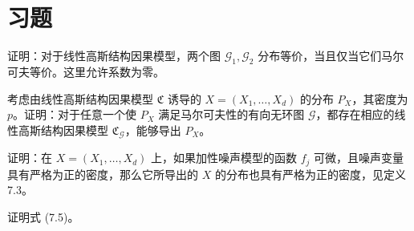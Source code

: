 \FloatBarrier
\section{习题}
\setcounter{problem}{11}
\begin{problem}[高斯结构因果模型]
证明：对于线性高斯结构因果模型，两个图 $\mathcal G_1,\mathcal G_2$ 分布等价，当且仅当它们马尔可夫等价。这里允许系数为零。
\end{problem}

\begin{problem}[高斯结构因果模型]
考虑由线性高斯结构因果模型 $\mathfrak C$ 诱导的 $X=(X_1,\ldots,X_d)$ 的分布 $P_X$，其密度为 $p$。证明：对于任意一个使 $P_X$ 满足马尔可夫性的有向无环图 $\mathcal G$，都存在相应的线性高斯结构因果模型 $\mathfrak C_{\mathcal G}$，能够导出 $P_X$。
\end{problem}

\begin{problem}[加性噪声模型]
证明：在 $X=(X_1,\ldots,X_d)$ 上，如果加性噪声模型的函数 $f_j$ 可微，且噪声变量具有严格为正的密度，那么它所导出的 $X$ 的分布也具有严格为正的密度，见定义7.3。
\end{problem}

\begin{problem}[不变因果预测]
证明式 (7.5)。
\end{problem}
